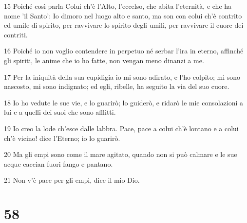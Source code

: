 \par 15 Poiché così parla Colui ch'è l'Alto, l'eccelso, che abita l'eternità, e che ha nome 'il Santo': Io dimoro nel luogo alto e santo, ma son con colui ch'è contrito ed umile di spirito, per ravvivare lo spirito degli umili, per ravvivare il cuore dei contriti.
\par 16 Poiché io non voglio contendere in perpetuo né serbar l'ira in eterno, affinché gli spiriti, le anime che io ho fatte, non vengan meno dinanzi a me.
\par 17 Per la iniquità della sua cupidigia io mi sono adirato, e l'ho colpito; mi sono nascosto, mi sono indignato; ed egli, ribelle, ha seguito la via del suo cuore.
\par 18 Io ho vedute le sue vie, e lo guarirò; lo guiderò, e ridarò le mie consolazioni a lui e a quelli dei suoi che sono afflitti.
\par 19 Io creo la lode ch'esce dalle labbra. Pace, pace a colui ch'è lontano e a colui ch'è vicino! dice l'Eterno; io lo guarirò.
\par 20 Ma gli empi sono come il mare agitato, quando non si può calmare e le sue acque caccian fuori fango e pantano.
\par 21 Non v'è pace per gli empi, dice il mio Dio.

\chapter{58}

